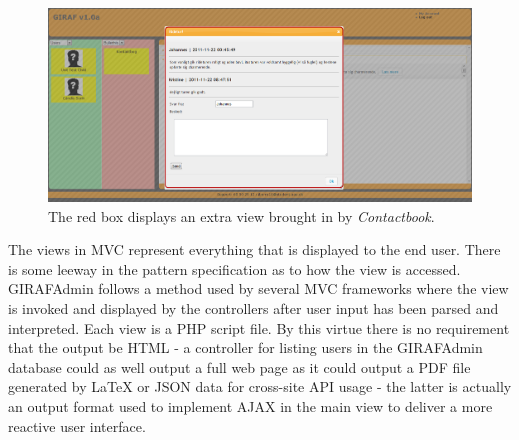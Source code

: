 \begin{figure}
    \begin{center}
    \includegraphics[scale=0.45,angle=90]{img/mvc_details/mvc_detailed_views2_view}
    \caption{\label{implementation_view_views2}The red box displays an extra view brought in by \emph{Contactbook}.}
    \end{center}
\end{figure}

The views in MVC represent everything that is displayed to the end user. There is some leeway in the pattern specification as to how the view is accessed. GIRAFAdmin follows a method used by several MVC frameworks where the view is invoked and displayed by the controllers after user input has been parsed and interpreted. Each view is a PHP script file. By this virtue there is no requirement that the output be HTML - a controller for listing users in the GIRAFAdmin database could as well output a full web page as it could output a PDF file generated by LaTeX or JSON data for cross-site API usage - the latter is actually an output format used to implement AJAX in the main view to deliver a more reactive user interface.

